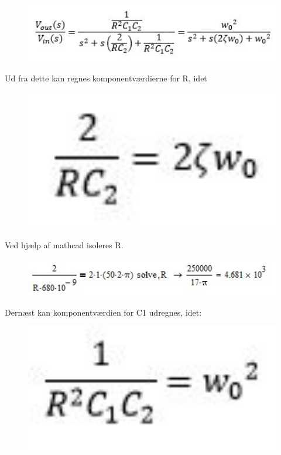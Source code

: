 \begin{figure}[H]
	\centering
	\includegraphics[width=1\textwidth]{Figurer/ligning3}
	\label{fig:lign3}
\end{figure}

Ud fra dette kan regnes komponentværdierne for R, idet

\begin{figure}[H]
	\centering
	\includegraphics[width=1\textwidth]{Figurer/ligning4}
	\label{fig:lign4}
\end{figure}

Ved hjælp af mathcad isoleres R.

\begin{figure}[H]
	\centering
	\includegraphics[width=1\textwidth]{Figurer/ligning5}
	\label{fig:lign5}
\end{figure}

Dernæst kan komponentværdien for C1 udregnes, idet:

\begin{figure}[H]
	\centering
	\includegraphics[width=1\textwidth]{Figurer/ligning6}
	\label{fig:lign6}
\end{figure}

